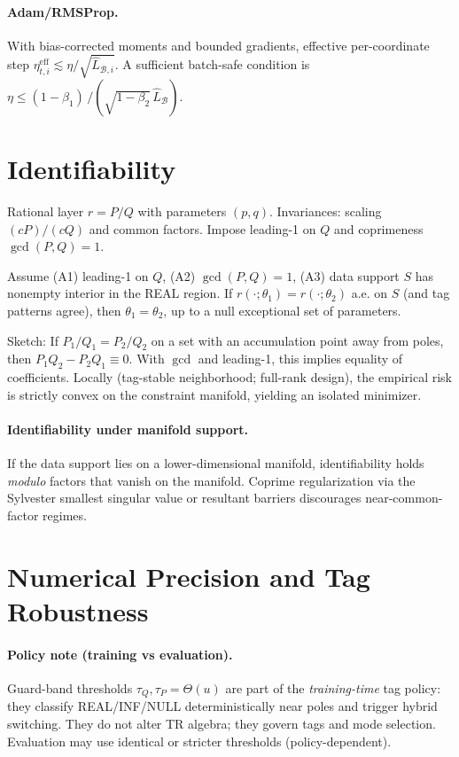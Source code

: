 \documentclass[twoside,11pt]{article}
\begin{document}
\paragraph{Adam/RMSProp.} With bias-corrected moments and bounded gradients, effective per-coordinate step $\eta_{t,i}^{\mathrm{eff}}\lesssim \eta/\sqrt{\hat L_{\mathcal{B},i}}$. A sufficient batch-safe condition is $\eta\le (1-\beta_1)\,/(\sqrt{1-\beta_2}\,\widehat L_\mathcal{B})$.

\section*{Identifiability}
\label{sec:ident}
Rational layer $r=P/Q$ with parameters $(p,q)$. Invariances: scaling $(cP)/(cQ)$ and common factors. Impose leading-1 on $Q$ and coprimeness $\gcd(P,Q)=1$.
\begin{proposition}[Identifiability a.e.]\label{prop:ident-prop}
Assume (A1) leading-1 on $Q$, (A2) $\gcd(P,Q)=1$, (A3) data support $S$ has nonempty interior in the REAL region. If $r(\cdot;\theta_1)=r(\cdot;\theta_2)$ a.e. on $S$ (and tag patterns agree), then $\theta_1=\theta_2$, up to a null exceptional set of parameters.
\end{proposition}
Sketch: If $P_1/Q_1=P_2/Q_2$ on a set with an accumulation point away from poles, then $P_1Q_2-P_2Q_1\equiv0$. With $\gcd$ and leading-1, this implies equality of coefficients. Locally (tag-stable neighborhood; full-rank design), the empirical risk is strictly convex on the constraint manifold, yielding an isolated minimizer.
\paragraph{Identifiability under manifold support.}\label{sec:ident-manifold}
If the data support lies on a lower-dimensional manifold, identifiability holds \emph{modulo} factors that vanish on the manifold. Coprime regularization via the Sylvester smallest singular value or resultant barriers discourages near-common-factor regimes.

\section*{Numerical Precision and Tag Robustness}
\label{sec:precision-tags}
\paragraph{Policy note (training vs evaluation).} Guard-band thresholds $\tau_Q,\tau_P=\Theta(u)$ are part of the \emph{training-time} tag policy: they classify REAL/INF/NULL deterministically near poles and trigger hybrid switching. They do not alter TR algebra; they govern tags and mode selection. Evaluation may use identical or stricter thresholds (policy-dependent).
\end{document}
